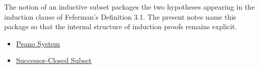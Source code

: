 \begin{remark*}
The notion of an inductive subset packages the two hypotheses appearing in the
induction clause of Feferman's Definition 3.1. The present notes name this
package so that the internal structure of induction proofs remains explicit.
\citep{FefermanNumberSystems1964}
\end{remark*}

\begin{dependencies}
\begin{itemize}
  \item \hyperref[def:peano-system]{Peano System}
  \item \hyperref[def:successor-closed-subset]{Successor-Closed Subset}
\end{itemize}
\end{dependencies}

